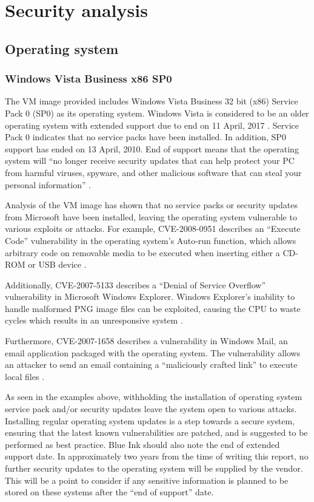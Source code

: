 \section{Security analysis}

\subsection{Operating system}

\subsubsection{Windows Vista Business x86 SP0}

The VM image provided includes Windows Vista Business 32 bit (x86) Service Pack 0 (SP0) as its operating system. Windows Vista is considered to be an older operating system with extended support due to end on 11 April, 2017 \citep{Microsoft2014}. Service Pack 0 indicates that no service packs have been installed. In addition, SP0 support has ended on 13 April, 2010. End of support means that the operating system will ``no longer receive security updates that can help protect your PC from harmful viruses, spyware, and other malicious software that can steal your personal information'' \citep{Microsoft2015}.

Analysis of the VM image has shown that no service packs or security updates from Microsoft have been installed, leaving the operating system vulnerable to various exploits or attacks. For example, CVE-2008-0951 describes an ``Execute Code'' vulnerability in the operating system's Auto-run function, which allows arbitrary code on removable media to be executed when inserting either a CD-ROM or USB device \citep{SecurityFocus2008}.

Additionally, CVE-2007-5133 describes a ``Denial of Service Overflow'' vulnerability in Microsoft Windows Explorer. Windows Explorer's inability to handle malformed PNG image files can be exploited, causing the CPU to waste cycles which results in an unresponsive system \citep{SecurityFocus2007a}.

Furthermore, CVE-2007-1658 describes a vulnerability in Windows Mail, an email application packaged with the operating system. The vulnerability allows an attacker to send an email containing a ``maliciously crafted link'' to execute local files \citep{SecurityFocus2007b}.

As seen in the examples above, withholding the installation of operating system service pack and/or security updates leave the system open to various attacks. Installing regular operating system updates is a step towards a secure system, ensuring that the latest known vulnerabilities are patched, and is suggested to be performed as best practice. Blue Ink should also note the end of extended support date. In approximately two years from the time of writing this report, no further security updates to the operating system will be supplied by the vendor. This will be a point to consider if any sensitive information is planned to be stored on these systems after the ``end of support'' date.

